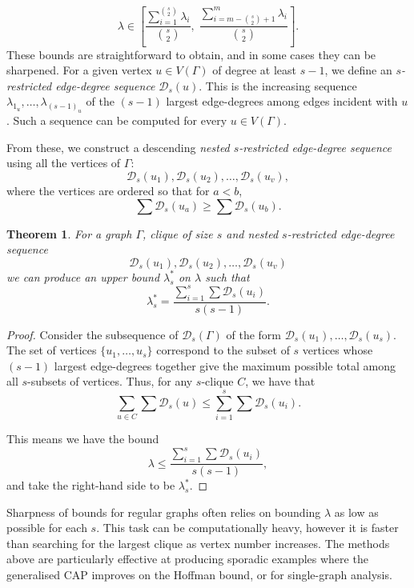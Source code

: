 \documentclass[11pt, baustms]{amsproc}
\theoremstyle{scplain}
\newtheorem{theorem}{Theorem}[section]
\renewcommand\le{\leqslant}
\renewcommand\ge{\geqslant}
\begin{document}
	\[
  \lambda \in 
  \left[
    \frac{\sum_{i=1}^{\binom{s}{2}} \lambda_i}{\binom{s}{2}}, \;
    \frac{\sum_{i=m-\binom{s}{2}+1}^{m} \lambda_i}{\binom{s}{2}}
  \right].
\]
	These bounds are straightforward to obtain, and in some cases they can be sharpened. For a given vertex $u \in V(\Gamma)$ of degree at least $s-1$, we define an \textit{$s$-restricted edge-degree sequence} $\mathcal{D}_s(u)$. This is the increasing sequence $\lambda_{1_u}, \dots, \lambda_{(s-1)_u}$ of the $(s-1)$ largest edge-degrees among edges incident with $u$. Such a sequence can be computed for every $u \in V(\Gamma)$.

	From these, we construct a descending \emph{nested $s$-restricted edge-degree sequence} using all the vertices of $\Gamma$: \[
  \mathcal{D}_s(u_1), \mathcal{D}_s(u_2), \dots, \mathcal{D}_s(u_v),
\]
where the vertices are ordered so that for $a < b$,
\[
  \sum \mathcal{D}_s(u_a) \ge \sum \mathcal{D}_s(u_b).
\]

	\begin{theorem}
	For a graph $\Gamma$, clique of size $s$ and nested $s$-restricted edge-degree sequence \[\mathcal{D}_s(u_1), \mathcal{D}_s(u_2), \dots, \mathcal{D}_s(u_v)\] we can produce an upper bound $\lambda^*_s$ on $\lambda$ such that \[\lambda_s^* = \frac{\sum_{i=1}^s \sum \mathcal{D}_s(u_i)}{s(s-1)}.\]
	\end{theorem}
    
	\begin{proof}
	Consider the subsequence of $\mathcal{D}_s(\Gamma)$ of the form $\mathcal{D}_s(u_{1}), \dots, \mathcal{D}_s(u_s)$.  
The set of vertices $\{u_{1}, \dots, u_s\}$ correspond to the subset of $s$ vertices whose $(s-1)$ largest edge-degrees together give the maximum possible total among all $s$-subsets of vertices. Thus, for any $s$-clique $C$, we have that 
    \[  
    \sum_{u\in C}\sum \mathcal{D}_s(u)  
    \le  
    \sum_{i=1}^s\sum \mathcal{D}_s(u_i).  
    \]
    
    This means we have the bound
\[
  \lambda \le 
  \frac{\sum_{i=1}^{s} \sum \mathcal{D}_s(u_i)}{s(s-1)},
\]
and take the right-hand side to be $\lambda^*_s$.
	\end{proof}
    
	Sharpness of bounds for regular graphs often relies on bounding $\lambda$ as low as possible for each $s$. This task can be computationally heavy, however it is faster than searching for the largest clique as vertex number increases. The methods above are particularly effective at producing sporadic examples where the generalised CAP improves on the Hoffman bound, or for single-graph analysis.
\end{document}
